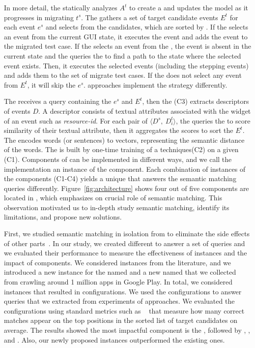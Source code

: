 \smallskip 
In more detail, the \generator statically analyzes $A^t$ to create a \tam and updates the model as it progresses in migrating $t^s$.
The \selector gathers a set of target candidate events $E^t$ for each event $e^s$ and selects from the candidates, which are sorted by \matcher.
If the \selector selects an event from the current GUI state, it executes the event and adds the event to the migrated test case.
If the \selector selects an event from the \tam, the event is absent in the current state and the \selector queries the \tam to find a path to the state where the selected event exists.
Then, it executes the selected events (including the stepping events) and adds them to the set of migrate test cases.
If the \selector does not select any event from $E^t$, it will skip the $e^s$.
\testreuse approaches implement the \selector strategy differently.


\smallskip 
The \matcher receives a query containing the $e^s$ and $E^t$, then the \ede (C3) extracts descriptors of events $D$.
A descriptor consists of textual attributes associated with the widget of an event such as \textit{resource-id}.
For each pair of $\langle D^s,  ~D_i^t\rangle$, the \sma queries the \wem to score similarity of their textual attribute, then it aggregates the scores to sort the $E^t$.
The \wem encodes words (or sentences) to vectors, representing the semantic distance of the words.
The \wem is built by one-time training of a \we techniques(C2) on a given \corpus (C1). 
Components of \testreuse can be implemented in different ways, and we call the implementation an instance of the component.
Each combination of instances of the \matcher components (C1-C4) yields a unique \smconfig that answers the semantic matching queries differently.
 Figure~\ref{fig:architecture} shows four out of five \testreuse components are located in \matcher, which emphasizes on crucial role of semantic matching.
 This observation motivated us to in-depth study semantic matching, identify its limitations, and propose new solutions. 

\smallskip 
 First, we studied semantic matching in isolation from \testreuse to eliminate the side effects of other \testreuse parts~\cite{mariani:SemFinder:ISSTA:2021}.
In our study, we created different \smconfigs to answer  a set of queries and we evaluated their performance to measure the effectiveness of instances and the impact of components.
We considered instances from the literature, and we introduced a new instance for the \sma named \tool and a new \corpus named \gp that we collected from crawling around 1 million apps in Google Play. 
In total, we considered \ninstances instances that resulted in \ncomb configurations.
We used the configurations to answer \nquery queries that we extracted from experiments of \testreuse approaches.
We evaluated the configurations using standard metrics such as \mrr~\cite{liu:MRR:learning:2009} that measure how many correct matches  appear on the top positions in the sorted list of target candidates on average. 
The results showed the most impactful component is the \sma, followed by \we, \ede, and \corpus. 
Also, our newly proposed instances outperformed the existing ones. 



